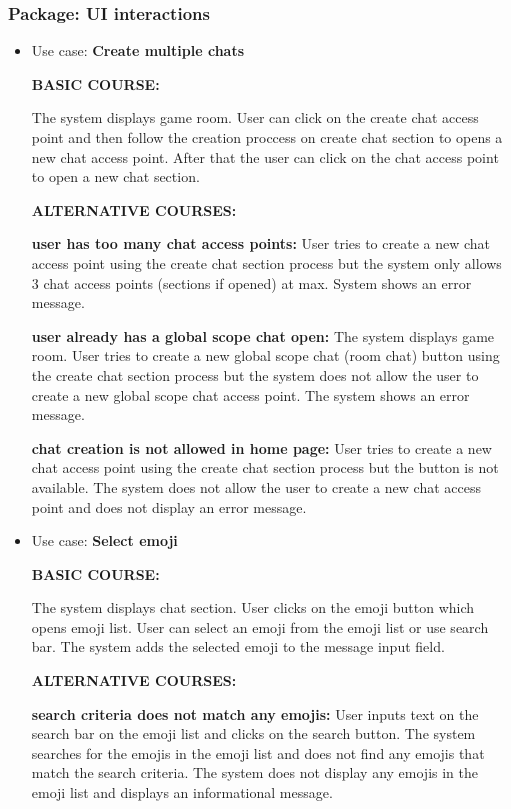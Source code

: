 \documentclass[]{VUMIFTemplateClass}
\begin{document}
\subsubsection{Package: UI interactions}
\begin{itemize}
    \item 
    Use case: \textbf{Create multiple chats}

    \textbf{BASIC COURSE:}

    The system displays game room. User can click on the create chat access point and then follow the creation proccess on create chat section to opens a new chat access point. After that the user can click on the chat access point to open a new chat section.
    
    \textbf{ALTERNATIVE COURSES:}

    \textbf{user has too many chat access points:}
    User tries to create a new chat access point using the create chat section process but the system only allows 3 chat access points (sections if opened) at max. System shows an error message.

    \textbf{user already has a global scope chat open:}
    The system displays game room. User tries to create a new global scope chat (room chat) button using the create chat section process but the system does not allow the user to create a new global scope chat access point. The system shows an error message.

    \textbf{chat creation is not allowed in home page:}
    User tries to create a new chat access point using the create chat section process but the button is not available. The system does not allow the user to create a new chat access point and does not display an error message.

    \item 
    Use case: \textbf{Select emoji}

    \textbf{BASIC COURSE:}

    The system displays chat section. User clicks on the emoji button which opens emoji list. User can select an emoji from the emoji list or use search bar. The system adds the selected emoji to the message input field.

    \textbf{ALTERNATIVE COURSES:}

    \textbf{search criteria does not match any emojis:}
    User inputs text on the search bar on the emoji list and clicks on the search button. The system searches for the emojis in the emoji list and does not find any emojis that match the search criteria. The system does not display any emojis in the emoji list and displays an informational message.


\end{itemize}
\end{document}
